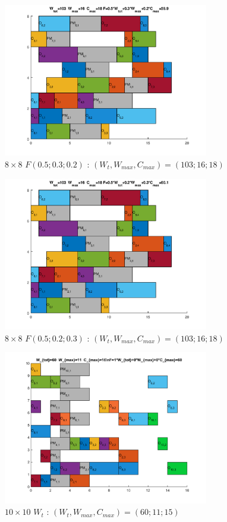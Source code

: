 \documentclass[10pt,a4paper]{scrartcl}
\begin{document}
\begin{figure}
  \centering
  \includegraphics[width=0.8\textwidth]{img/results8x8_F050302.png}
  \caption{$8 \times 8$ $F(0.5;0.3;0.2)$ : $(W_t, W_{max}, C_{max}) = (103; 16; 18)$}
\end{figure}
\begin{figure}
  \centering
  \includegraphics[width=0.8\textwidth]{img/results8x8_F050203.png}
  \caption{$8 \times 8$ $F(0.5;0.2;0.3)$ : $(W_t, W_{max}, C_{max}) = (103; 16; 18)$}
\end{figure}
\begin{figure}
  \centering
  \includegraphics[width=0.8\textwidth]{img/results10x10_Wtot.png}
  \caption{$10 \times 10$ $W_{t}$ : $(W_t, W_{max}, C_{max}) = (60; 11; 15)$}
\end{figure}
\end{document}
